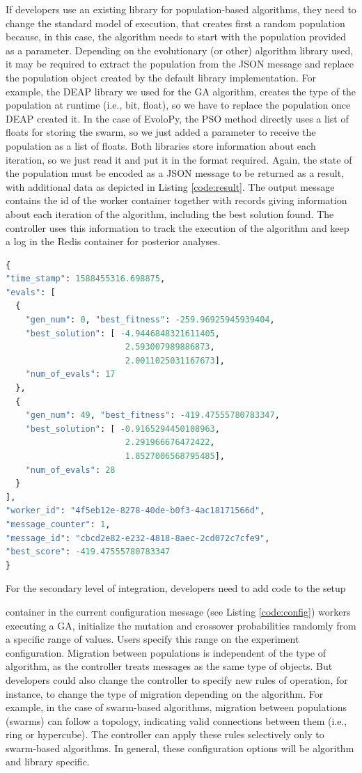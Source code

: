 \documentclass[review]{elsarticle}
\begin{document}
If developers use an existing library for population-based algorithms, they need
to change the standard model of execution, that creates first a random
population because, in this case, the algorithm needs to start with the
population provided as a parameter. Depending on the evolutionary (or other) algorithm library used,
it may be required to extract the population from the
JSON message and replace the population object created by the default library implementation. For
example, the DEAP library we used for the GA algorithm, creates the type of the
population at runtime (i.e., bit, float), so we have to replace the population
once DEAP created it. In the case of EvoloPy, the PSO method directly uses a
list of floats for storing the swarm, so we just added a parameter to receive
the population as a list of floats. Both libraries store information about each
iteration, so we just read it and put it in the format required.
Again, the state of the population must be encoded as a JSON message to be
returned as a result, with additional data as
depicted in Listing \ref{code:result}. The output message contains the id of the
worker container together with records giving information about each iteration
of the algorithm, including the best solution found. The controller uses this
information to track the execution of the algorithm and keep a log in the Redis
container for posterior analyses.

\begin{lstlisting}[language=Python, caption=Fragment of output message, label=code:result ]
{
"time_stamp": 1588455316.698875,
"evals": [
  {
    "gen_num": 0, "best_fitness": -259.96925945939404,
    "best_solution": [ -4.9446848321611405, 
                        2.593007989886873, 
                        2.0011025031167673],
    "num_of_evals": 17
  },
  {
    "gen_num": 49, "best_fitness": -419.47555780783347,
    "best_solution": [ -0.9165294450108963, 
                        2.291966676472422, 
                        1.8527006568795485],
    "num_of_evals": 28
  }
],
"worker_id": "4f5eb12e-8278-40de-b0f3-4ac18171566d",
"message_counter": 1,
"message_id": "cbcd2e82-e232-4818-8aec-2cd072c7cfe9",
"best_score": -419.47555780783347
}
\end{lstlisting}

For the secondary level of integration, developers need to add code to the setup

container
in the current configuration message (see Listing \ref{code:config})
workers executing a GA, initialize the mutation and crossover 
probabilities randomly from a specific range of values. Users specify
this range on the experiment configuration. 
Migration between populations is independent of the type of algorithm, as the
controller treats messages as the same type of objects. But developers could
also change the controller to specify new rules of operation, for instance, to
change the type of migration depending on the algorithm. 
For example, in the case of swarm-based algorithms,  migration between  
populations (swarms) can follow a topology, indicating valid connections 
between them (i.e., ring or hypercube). The controller
can apply these rules selectively only to swarm-based algorithms. 
In general, these configuration options will be algorithm and library specific. 
\end{document}
